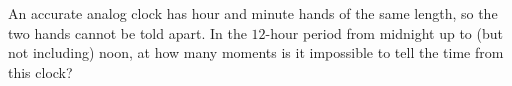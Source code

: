 An accurate analog clock has hour and minute hands of the same length, so the two hands cannot be told apart. In the $12$-hour period from midnight up to (but not including) noon, at how many moments is it impossible to tell the time from this clock?
